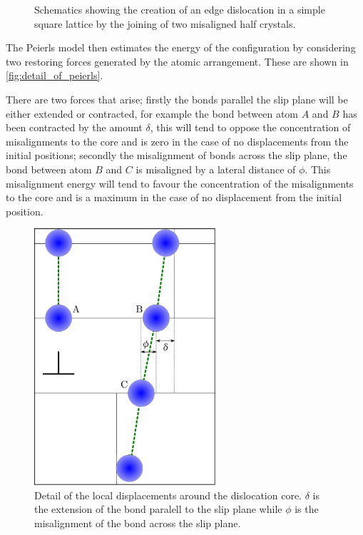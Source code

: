 \begin{figure}
    \caption{Schematics showing the creation of an edge dislocation in a simple square lattice by the joining of two misaligned half crystals. \label{fig:edge_disloc}}
\end{figure}



The Peierls model then estimates the energy of the configuration by considering two restoring forces generated by the atomic arrangement. These are shown in \autoref{fig:detail_of_peierls}. 

There are two forces that arise; firstly the bonds parallel the slip plane will be either extended or contracted, for example the bond between atom $A$ and $B$ has been contracted by the amount $\delta$, this will tend to oppose the concentration of misalignments to the core and  is zero in the case of no displacements from the initial positions; secondly the misalignment of bonds across the slip plane, the bond between atom $B$ and $C$ is misaligned by a lateral distance of $\phi$. This misalignment energy will tend to favour the concentration of the misalignments to the core and is a maximum in the case of no displacement from the initial position.


\begin{figure}
\centering
\includegraphics[width=0.6\textwidth]{peierls_model_detail}

\caption{Detail of the local displacements around the dislocation core. $\delta$ is the extension of the bond paralell to the slip plane while $\phi$ is the misalignment of the bond across the slip plane.\label{fig:detail_of_peierls}}
\end{figure}


